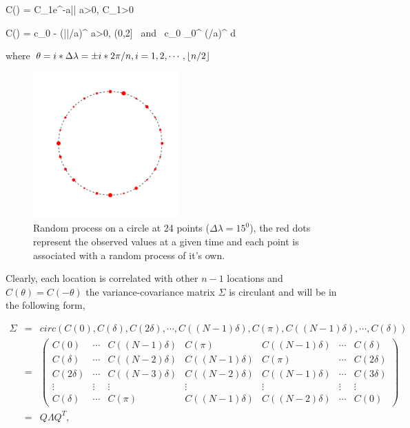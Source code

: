 \beq \label{exp_cov} 
C(\theta) = C_1e^{-a|\theta|} \quad a>0, C_1>0
\eeq

\beq \label{power_cov} 
C(\theta) = c_0 - (|\theta|/a)^{\alpha} \quad a>0, \alpha \in (0,2] \mbox{ and } c_0 \ge \int_0^\pi
			(\theta/a)^{\alpha} \sin \theta d \theta
\eeq


where $\theta = i*\Delta\lambda = \pm i*2\pi/n, i=1,2,\cdots,\lfloor{n/2}\rfloor$ \\

\begin{figure}
	\centering
	\includegraphics[width=0.5\textwidth]{graphs/process_circle}
	\caption {Random process on a circle at 24 points ($\Delta\lambda = 15^0$), the red dots represent the  observed values at a given time and each point is associated with a random process of it's own.}
\end{figure}

Clearly, each location is correlated with other $n-1$ locations and $C(\theta) = C(-\theta)$ the variance-covariance matrix $\Sigma$ is circulant and will be in the following form,   


\begin{eqnarray*}
	\Sigma &=& circ(C(0),C(\delta), C(2\delta), \cdots, C((N-1)\delta), C(\pi),  C((N-1)\delta), \cdots, C(\delta)) \\
	&=& \left(\begin{array}{ccccccc}
	C(0)      & \cdots & C((N-1)\delta ) & C(\pi) &  C((N-1)\delta ) & \cdots & C(\delta) \\
	C(\delta) & \cdots & C((N-2)\delta) & C((N-1)\delta) &  C(\pi)  & \cdots & C(2\delta) \\
	C(2\delta) & \cdots & C((N-3)\delta) & C((N-2)\delta) &  C((N-1)\delta) & \cdots & C(3\delta)\\
	\vdots    & \vdots  & \vdots  & \vdots  & \vdots  & \vdots  & \vdots  \\
	C(\delta) & \cdots & C(\pi) &  C((N-1)\delta) & C((N-2)\delta)  & \cdots & C(0) 
	\end{array} \right) \\
	&=& Q\Lambda Q^T,
\end{eqnarray*}

